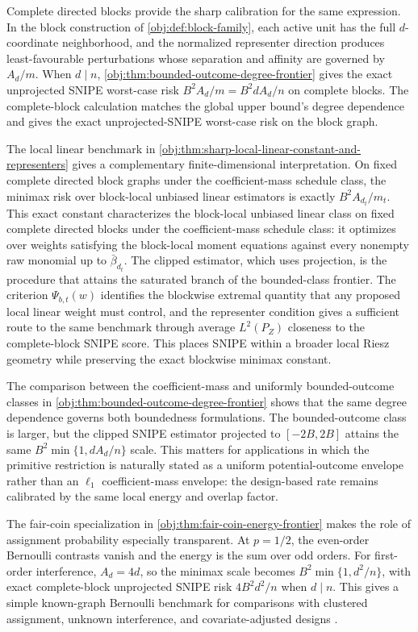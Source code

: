\documentclass[11pt]{article}
\begin{document}
Complete directed blocks provide the sharp calibration for the same expression. In the block construction of \cref{obj:def:block-family}, each active unit has the full \(d\)-coordinate neighborhood, and the normalized representer direction produces least-favourable perturbations whose separation and affinity are governed by \(A_d/m\). When \(d\mid n\), \cref{obj:thm:bounded-outcome-degree-frontier} gives the exact unprojected SNIPE worst-case risk \(B^2A_d/m=B^2dA_d/n\) on complete blocks. The complete-block calculation matches the global upper bound's degree dependence and gives the exact unprojected-SNIPE worst-case risk on the block graph.

The local linear benchmark in \cref{obj:thm:sharp-local-linear-constant-and-representers} gives a complementary finite-dimensional interpretation. On fixed complete directed block graphs under the coefficient-mass schedule class, the minimax risk over block-local unbiased linear estimators is exactly \(B^2A_{d_t}/m_t\). This exact constant characterizes the block-local unbiased linear class on fixed complete directed blocks under the coefficient-mass schedule class: it optimizes over weights satisfying the block-local moment equations against every nonempty raw monomial up to \(\bar\beta_{d_t}\). The clipped estimator, which uses projection, is the procedure that attains the saturated branch of the bounded-class frontier. The criterion \(\Psi_{b,t}(w)\) identifies the blockwise extremal quantity that any proposed local linear weight must control, and the representer condition gives a sufficient route to the same benchmark through average \(L^2(P_Z)\) closeness to the complete-block SNIPE score. This places SNIPE within a broader local Riesz geometry while preserving the exact blockwise minimax constant.

The comparison between the coefficient-mass and uniformly bounded-outcome classes in \cref{obj:thm:bounded-outcome-degree-frontier} shows that the same degree dependence governs both boundedness formulations. The bounded-outcome class is larger, but the clipped SNIPE estimator projected to \([-2B,2B]\) attains the same \(B^2\min\{1,dA_d/n\}\) scale. This matters for applications in which the primitive restriction is naturally stated as a uniform potential-outcome envelope rather than an \(\ell_1\) coefficient-mass envelope: the design-based rate remains calibrated by the same local energy and overlap factor.

The fair-coin specialization in \cref{obj:thm:fair-coin-energy-frontier} makes the role of assignment probability especially transparent. At \(p=1/2\), the even-order Bernoulli contrasts vanish and the energy is the sum over odd orders. For first-order interference, \(A_d=4d\), so the minimax scale becomes \(B^2\min\{1,d^2/n\}\), with exact complete-block unprojected SNIPE risk \(4B^2d^2/n\) when \(d\mid n\). This gives a simple known-graph Bernoulli benchmark for comparisons with clustered assignment, unknown interference, and covariate-adjusted designs \citep{EichhornKhanUganderYu2026,WangLi2026}.
\end{document}
